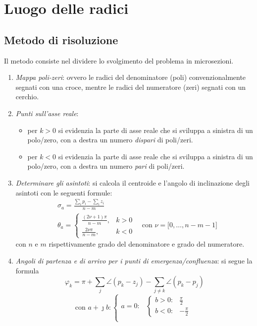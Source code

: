 \chapter{Luogo delle radici}
\section{Metodo di risoluzione}
Il metodo consiste nel dividere lo svolgimento del problema in microsezioni.
\begin{enumerate}
	\item \emph{Mappa poli-zeri}: ovvero le radici del denominatore (poli)
		convenzionalmente segnati con una croce, mentre le radici del
		numeratore (zeri) segnati con un cerchio.
	\item \emph{Punti sull'asse reale}:
		\begin{itemize}
			\item per \(k>0\) si evidenzia la parte di asse reale
			che si sviluppa a sinistra di un polo/zero, con a destra
			un numero \emph{dispari} di poli/zeri.
			\item per \(k<0\) si evidenzia la parte di asse reale
			che si sviluppa a sinistra di un polo/zero, con a destra
			un numero \emph{pari} di poli/zeri.
		\end{itemize}
	\item \emph{Determinare gli asintoti}: si calcola il centroide e l'angolo
		di inclinazione degli asintoti con le seguenti formule:
		\begin{align*}
			& \sigma_a = \frac{\sum_{i} p_i - \sum_{i} z_i}{n-m} \\
			& \theta_a = \begin{cases}
					\frac{(2\nu+1)\pi}{n-m}, & k>0 \\
					\frac{2\nu\pi}{n-m}, & k<0
				\end{cases}
				\quad \text{con } \nu = \bigl[0,\dots,n-m-1\bigr]
		\end{align*}
		con \(n\) e \(m\) rispettivamente grado del denominatore e grado del numeratore.
	\item \emph{Angoli di partenza e di arrivo per i punti di emergenza/confluenza}:
		si segue la formula
		\[
			\varphi_k = \pi +\sum_j \angle(p_k-z_j) -\sum_{j \neq k} \angle(p_k-p_j)
		\]
		\[
			\text{con } a+\jmath b \colon
			\begin{cases}
				a = 0 \colon &
					\begin{cases}
						b > 0\colon & \frac{\pi}{2} \\
						b < 0\colon & -\frac{\pi}{2}
					\end{cases} \\

\end{cases}\]
\end{enumerate}
